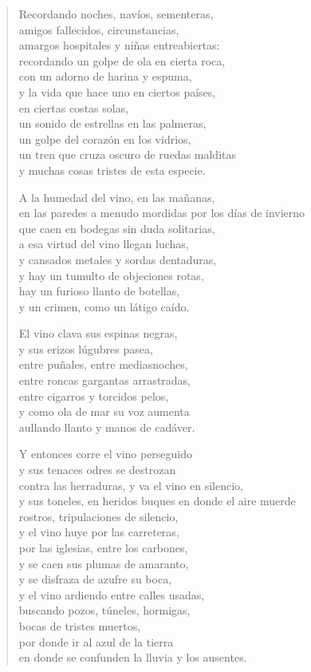 \documentclass[12pt]{article}
\begin{document}
\begin{verse}
Recordando noches, navíos, sementeras,\\
amigos fallecidos, circunstancias,\\
amargos hospitales y niñas entreabiertas:\\
recordando un golpe de ola en cierta roca,\\
con un adorno de harina y espuma,\\
y la vida que hace uno en ciertos países,\\
en ciertas costas solas,\\
un sonido de estrellas en las palmeras,\\
un golpe del corazón en los vidrios,\\
un tren que cruza oscuro de ruedas malditas\\
y muchas cosas tristes de esta especie.  

A la humedad del vino, en las mañanas,\\
en las paredes a menudo mordidas por los días de invierno\\
que caen en bodegas sin duda solitarias,\\
a esa virtud del vino llegan luchas,\\
y cansados metales y sordas dentaduras,\\
y hay un tumulto de objeciones rotas,\\
hay un furioso llanto de botellas,\\
y un crimen, como un látigo caído.  

El vino clava sus espinas negras,\\
y sus erizos lúgubres pasea,\\
entre puñales, entre mediasnoches,\\
entre roncas gargantas arrastradas,\\
entre cigarros y torcidos pelos,\\
y como ola de mar su voz aumenta\\
aullando llanto y manos de cadáver.  

Y entonces corre el vino perseguido\\
y sus tenaces odres se destrozan\\
contra las herraduras, y va el vino en silencio,\\
y sus toneles, en heridos buques en donde el aire muerde\\
rostros, tripulaciones de silencio,\\
y el vino huye por las carreteras,\\
por las iglesias, entre los carbones,\\
y se caen sus plumas de amaranto,\\
y se disfraza de azufre su boca,\\
y el vino ardiendo entre calles usadas,\\
buscando pozos, túneles, hormigas,\\
bocas de tristes muertos,\\
por donde ir al azul de la tierra\\
en donde se confunden la lluvia y los ausentes.  

\end{verse}
\end{document}
